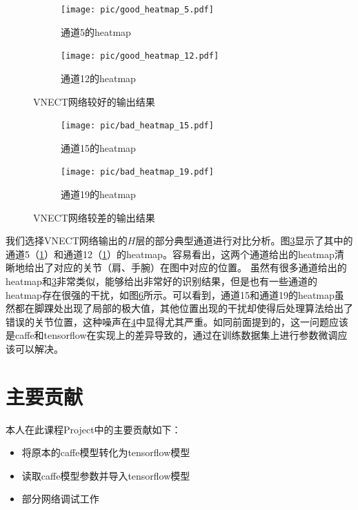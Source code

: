 \documentclass[a4paper, 10pt]{ctexart}
\begin{document}
\begin{figure}[!ht]
        \begin{subfigure}[b]{0.5\textwidth}
                \texttt{[image: pic/good\_heatmap\_5.pdf]}
                \caption{通道5的heatmap}
                \label{pic:good5}
        \end{subfigure}
        \hfill
        \begin{subfigure}[b]{0.5\textwidth}
                \texttt{[image: pic/good\_heatmap\_12.pdf]}
                \caption{通道12的heatmap}
                \label{pic:good12}
        \end{subfigure}
        \caption{VNECT网络较好的输出结果\label{pic:good}}
\end{figure}

\begin{figure}[!ht]
        \begin{subfigure}[b]{0.5\textwidth}
                \texttt{[image: pic/bad\_heatmap\_15.pdf]}
                \caption{通道15的heatmap}
                \label{pic:bad15}
        \end{subfigure}
        \hfill
        \begin{subfigure}[b]{0.5\textwidth}
                \texttt{[image: pic/bad\_heatmap\_19.pdf]}
                \caption{通道19的heatmap}
                \label{pic:bad19}
        \end{subfigure}
        \caption{VNECT网络较差的输出结果 \label{pic:bad}}
\end{figure}

我们选择VNECT网络输出的$H$层的部分典型通道进行对比分析。图\ref{pic:good}显示了其中的通道5（\ref{pic:good5}）和通道12（\ref{pic:good5}）的heatmap。容易看出，这两个通道给出的heatmap清晰地给出了对应的关节（肩、手腕）在图中对应的位置。
虽然有很多通道给出的heatmap和\ref{pic:good}非常类似，能够给出非常好的识别结果，但是也有一些通道的heatmap存在很强的干扰，如图\ref{pic:bad}所示。可以看到，通道15和通道19的heatmap虽然都在脚踝处出现了局部的极大值，其他位置出现的干扰却使得后处理算法给出了错误的关节位置，这种噪声在\ref{pic:bad15}中显得尤其严重。如同前面提到的，这一问题应该是caffe和tensorflow在实现上的差异导致的，通过在训练数据集上进行参数微调应该可以解决。

\section{主要贡献}
本人在此课程Project中的主要贡献如下：
\begin{itemize}
        \item 将原本的caffe模型转化为tensorflow模型
        \item 读取caffe模型参数并导入tensorflow模型
        \item 部分网络调试工作
\end{itemize}




\end{document}
